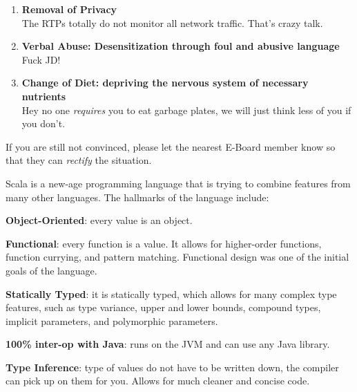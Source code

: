 \documentclass[9pt]{extarticle} %
\begin{document}
\begin{minipage}[t]{.61\linewidth}
\begin{enumerate}
\item \textbf{Removal of Privacy} \\
The RTPs totally do not monitor all network traffic. That's crazy talk. 

\item \textbf{Verbal Abuse: Desensitization through foul and abusive language} \\
Fuck JD!

\item \textbf{Change of Diet: depriving the nervous system of necessary 
nutrients} \\
Hey no one \textit{requires} you to eat garbage plates, we will just think less
of you if you don't.


\end{enumerate}

If you are still not convinced, please let the nearest E-Board member know so
that they can \textit{rectify} the situation. 


\hypertarget{secondnews}{} 

Scala is a new-age programming language that is trying to combine features
from many other languages. The hallmarks of the language include:

\textbf{Object-Oriented}: every value is an object.

\textbf{Functional}: every function is a value. It allows for higher-order
	functions, function currying, and pattern matching. Functional design was one
	of the initial goals of the language.
	
\textbf{Statically Typed}: it is statically typed, which allows for many
	complex type features, such as type variance, upper and lower bounds, 
	compound types, implicit parameters, and polymorphic parameters.

\textbf{100\% inter-op with Java}: runs on the JVM and can use any
	Java library.

\textbf{Type Inference}: type of values do not have to be written down, the
	compiler can pick up on them for you. Allows for much cleaner and 
	concise code. 

\end{minipage} %
\end{document}
